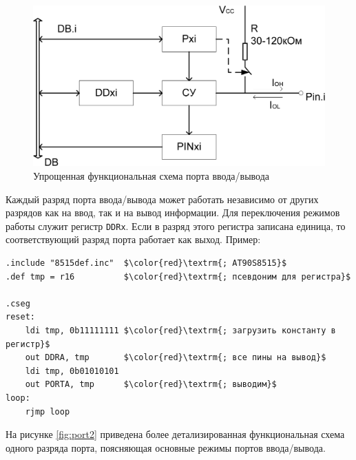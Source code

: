 \documentclass[main.tex]{subfiles}
\begin{document}
\begin{figure}[t]
\centering
\includegraphics[scale=0.25]{images/port1.png}
\caption{Упрощенная функциональная схема порта ввода/вывода}
\label{fig:port1}
\end{figure}

Каждый разряд порта ввода/вывода  может работать независимо от других разрядов как на ввод, так и на вывод информации. Для переключения режимов работы служит регистр \texttt{DDRx}. Если в разряд этого регистра записана единица, то соответствующий разряд порта работает как выход. Пример: 

\begin{lstlisting}
.include "8515def.inc"  $\color{red}\textrm{; AT90S8515}$
.def tmp = r16          $\color{red}\textrm{; псевдоним для регистра}$

.cseg
reset:
    ldi tmp, 0b11111111 $\color{red}\textrm{; загрузить константу в регистр}$
    out DDRA, tmp       $\color{red}\textrm{; все пины на вывод}$
    ldi tmp, 0b01010101
    out PORTA, tmp      $\color{red}\textrm{; выводим}$
loop:
    rjmp loop
\end{lstlisting}

На рисунке \ref{fig:port2} приведена  более детализированная функциональная схема одного разряда порта, поясняющая основные режимы портов ввода/вывода.
\end{document}
